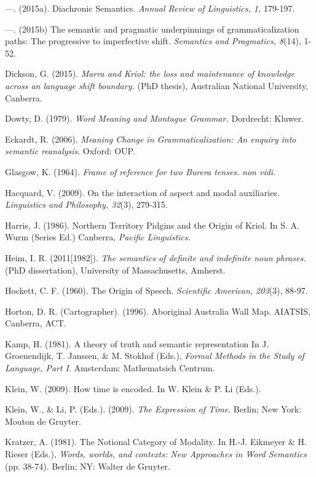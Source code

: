 \documentclass[12pt]{article}
\begin{document}
\begin{hangparas}{3em}{1}
---. (2015a). Diachronic Semantics.\textit{ Annual Review of Linguistics, 1,} 179-197. 

---. (2015b) The semantic and pragmatic underpinnings of grammaticalization paths: The progressive to imperfective shift.\textit{ Semantics and Pragmatics, 8}(14), 1-52. 


Dickson, G. (2015). \textit{Marra and Kriol: the loss and maintenance of knowledge across an language shift boundary.} (PhD thesis), Australian National University, Canberra.   

Dowty, D. (1979).\textit{ Word Meaning and Montague Grammar.} Dordrecht: Kluwer.



Eckardt, R. (2006).\textit{ Meaning Change in Grammaticalization: An enquiry into semantic reanalysis}. Oxford: OUP.


Glasgow, K. (1964). \textit{Frame of reference for two Burera tenses.} \textsl{non vidi.}


Hacquard, V. (2009). On the interaction of aspect and modal auxiliaries. \textit{Linguistics and Philosophy, 32}(3), 279-315. 


Harris, J. (1986). Northern Territory Pidgins and the Origin of Kriol. In S. A. Wurm (Series Ed.) Canberra, \textit{Pacific Linguistics.}


Heim, I. R. (2011[1982]). \textit{The semantics of definite and indefinite noun phrases.} (PhD dissertation), University of Massachusetts, Amherst.   



Hockett, C. F. (1960). The Origin of Speech. \textit{Scientific American, 203}(3), 88-97. 

Horton, D. R. (Cartographer). (1996). Aboriginal Australia Wall Map. AIATSIS, Canberra, ACT.



Kamp, H. (1981). A theory of truth and semantic representation In J. Groenendijk, T. Janssen, \& M. Stokhof (Eds.),\textit{ Formal Methods in the Study of Language, Part I}. Amsterdam: Mathematsich Centrum.



Klein, W. (2009). How time is encoded. In W. Klein \& P. Li (Eds.).


Klein, W., \& Li, P. (Eds.). (2009).\textit{ The Expression of Time}. Berlin; New York: Mouton de Gruyter.



Kratzer, A. (1981). The Notional Category of Modality. In H.-J. Eikmeyer \& H. Rieser (Eds.),\textit{ Words, worlds, and contexts: New Approaches in Word Semantics }(pp. 38-74). Berlin; NY: Walter de Gruyter.



\end{hangparas}
\end{document}
